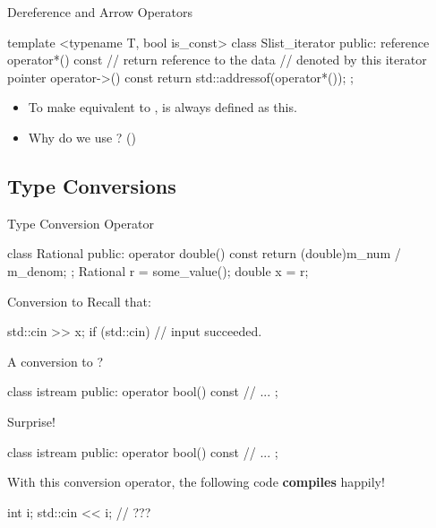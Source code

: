 \begin{frame}[fragile]{Dereference and Arrow Operators}
    \begin{cpp}
template <typename T, bool is_const>
class Slist_iterator {
 public:
  reference operator*() const {
    // return reference to the data
    // denoted by this iterator
  }
  pointer operator->() const {
    return std::addressof(operator*());
  }
};
    \end{cpp}
    \begin{itemize}
        \item To make  equivalent to ,  is always defined as this.
        \item Why do we use ? ()
    \end{itemize}
\end{frame}

\subsection{Type Conversions}

\begin{frame}[fragile]{Type Conversion Operator}
    \begin{cpp}
class Rational {
 public:
  operator double() const {
    return (double)m_num / m_denom;
  }
};
Rational r = some_value();
double x = r;
    \end{cpp}
\end{frame}

\begin{frame}[fragile]{Conversion to }
    Recall that:
    \begin{cpp}
std::cin >> x;
if (std::cin)
  // input succeeded.
    \end{cpp}
    A conversion to ?
    \begin{cpp}
class istream {
 public:
  operator bool() const {
    // ...
  }
};
    \end{cpp}
\end{frame}

\begin{frame}[fragile]{Surprise!}
    \begin{cpp}
class istream {
 public:
  operator bool() const {
    // ...
  }
};
    \end{cpp}
    With this conversion operator, the following code \textbf{compiles} happily!
    \begin{cpp}
int i;
std::cin << i; // ???
    \end{cpp}
\end{frame}

